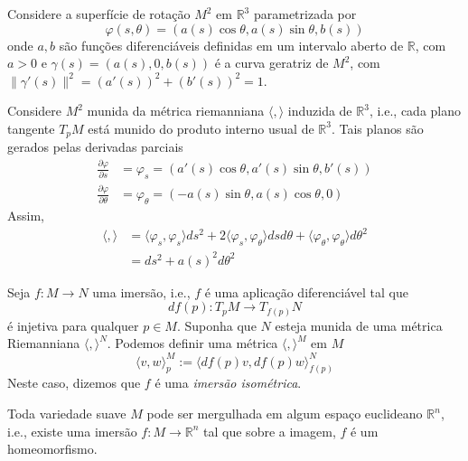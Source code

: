\begin{exemplo}
	Considere a superfície de rotação $M^2$ em $\mathbb{R}^3$ parametrizada por
	\begin{equation*}
		\varphi(s,\theta) = (a(s) \cos \theta, a(s) \sin \theta, b(s))
	\end{equation*}	
	onde $a,b$ são funções diferenciáveis definidas em um intervalo aberto de $\mathbb{R}$, com $a>0$ e $\gamma(s) = (a(s),0,b(s))$ é a curva geratriz de $M^2$, com $\| \gamma'(s) \|^2 = (a'(s))^2 + (b'(s))^2 = 1$.
	
	Considere $M^2$ munida da métrica riemanniana $\langle , \rangle$ induzida de $\mathbb{R}^3$, i.e., cada plano tangente $T_p M$ está munido do produto interno usual de $\mathbb{R}^3$. Tais planos são gerados pelas derivadas parciais
	\begin{align*}
		\frac{\partial \varphi}{\partial s} &= \varphi_s = (a'(s) \cos \theta, a'(s) \sin \theta, b'(s))\\
		\frac{\partial \varphi}{\partial \theta} &= \varphi_{\theta} = (-a(s) \sin \theta, a(s) \cos \theta, 0)
	\end{align*}	
	Assim,
	\begin{align*}
		\langle , \rangle &= \langle \varphi_s, \varphi_s \rangle ds^2 + 2 \langle \varphi_s, \varphi_{\theta} \rangle ds d\theta + \langle \varphi_{\theta}, \varphi_{\theta} \rangle d\theta^2\\
		&= ds^2 + a(s)^2 d\theta^2
	\end{align*}
\end{exemplo}

\begin{exemplo}
	Seja $f: M \rightarrow N$ uma imersão, i.e., $f$ é uma aplicação diferenciável tal que
	\begin{equation*}
		df(p): T_p M \rightarrow T_{f(p)} N
	\end{equation*}	
	é injetiva para qualquer $p \in M$. Suponha que $N$ esteja munida de uma métrica Riemanniana $\langle , \rangle^N$. Podemos definir uma métrica $\langle , \rangle^M$ em $M$
	\begin{equation*}
		\langle v,w \rangle_p^M := \langle df(p) v, df(p) w \rangle_{f(p)}^N
	\end{equation*}	
	Neste caso, dizemos que $f$ é uma \emph{imersão isométrica}.
\end{exemplo}

\begin{teorema}[Nash]
	Toda variedade suave $M$ pode ser mergulhada em algum espaço euclideano $\mathbb{R}^n$, i.e., existe uma imersão $f: M \rightarrow \mathbb{R}^n$ tal que sobre a imagem, $f$ é um homeomorfismo.
\end{teorema}

